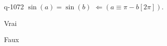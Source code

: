 \begin{truefalse}{q-1072}
$\sin(a)=\sin(b)$  $\Leftarrow \left(a\equiv \pi-b [2\pi]\right)$.
\item* Vrai
\item Faux
\end{truefalse}


